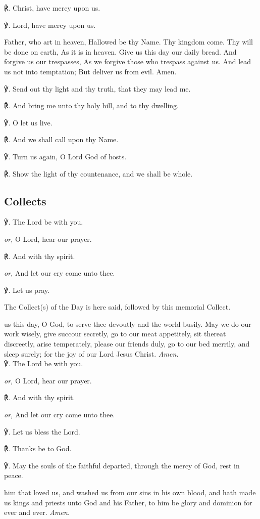 \begin{multicols}{2}
℟. Christ, have mercy upon us.

℣. Lord, have mercy upon us.

 Father, who art in heaven, Hallowed be thy Name. Thy kingdom come. Thy will be done on earth, As it is in heaven. Give us this day our daily bread. And forgive us our trespasses, As we forgive those who trespass against us. And lead us not into temptation; But deliver us from evil. Amen.

℣. Send out thy light and thy truth, that they may lead me.

℟. And bring me unto thy holy hill, and to thy dwelling.

℣. O let us live.

℟. And we shall call upon thy Name.

℣. Turn us again, O Lord God of hosts.

℟. Show the light of thy countenance, and we shall be whole.

\subsection{Collects}
℣. The Lord be with you.\par
\textit{or,} O Lord, hear our prayer.

℟. And with thy spirit.\par
\textit{or,} And let our cry come unto thee.

℣. Let us pray.

\begin{rubric}
	The Collect(s) of the Day is here said, followed by this memorial Collect.
\end{rubric}

 us this day, O God, to serve thee devoutly and the world busily. May we do our work wisely, give succour secretly, go to our meat appetitely, sit thereat discreetly, arise temperately, please our friends duly, go to our bed merrily, and sleep surely; for the joy of our Lord Jesus Christ. \textit{Amen.}\\

℣. The Lord be with you.\par
\textit{or,} O Lord, hear our prayer.

℟. And with thy spirit.\par
\textit{or,} And let our cry come unto thee.

℣. Let us bless the Lord.

℟. Thanks be to God.

℣. May the souls {} of the faithful departed, through the mercy of God, rest in peace.

 him that loved us, and washed us from our sins in his own blood, and hath made us kings and priests unto God and his Father, to him be glory and dominion for ever and ever. \textit{Amen.}

\end{multicols}

